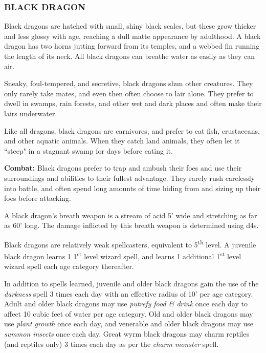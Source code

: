 \begin{multicols}{2}

\subsubsection{BLACK DRAGON}

Black dragons are hatched with small, shiny black scales, but these grow thicker and less glossy with age, reaching a dull matte appearance by adulthood. A black dragon has two horns jutting forward from its temples, and a webbed fin running the length of its neck. All black dragons can breathe water as easily as they can air.

Sneaky, foul-tempered, and secretive, black dragons shun other creatures. They only rarely take mates, and even then often choose to lair alone. They prefer to dwell in swamps, rain forests, and other wet and dark places and often make their lairs underwater.

Like all dragons, black dragons are carnivores, and prefer to eat fish, crustaceans, and other aquatic animals. When they catch land animals, they often let it ``steep" in a stagnant swamp for days before eating it.

\textbf{Combat:} Black dragons prefer to trap and ambush their foes and use their surroundings and abilities to their fullest advantage. They rarely rush carelessly into battle, and often spend long amounts of time hiding from and sizing up their foes before attacking.

A black dragon's breath weapon is a stream of acid 5' wide and stretching as far as 60' long. The damage inflicted by this breath weapon is determined using d4s. 

Black dragons are relatively weak spellcasters, equivalent to 5\textsuperscript{th} level. A juvenile black dragon learns 1 1\textsuperscript{st} level wizard spell, and learns 1 additional 1\textsuperscript{st} level wizard spell each age category thereafter. 

In addition to spells learned, juvenile and older black dragons gain the use of the \textit{darkness} spell 3 times each day with an effective radius of 10' per age category. Adult and older black dragons may use \textit{putrefy food \& drink} once each day to affect 10 cubic feet of water per age category. Old and older black dragons may use \textit{plant growth} once each day, and venerable and older black dragons may use \textit{summon insects} once each day. Great wyrm black dragons may charm reptiles (and reptiles only) 3 times each day as per the \textit{charm monster} spell.


\end{multicols}
